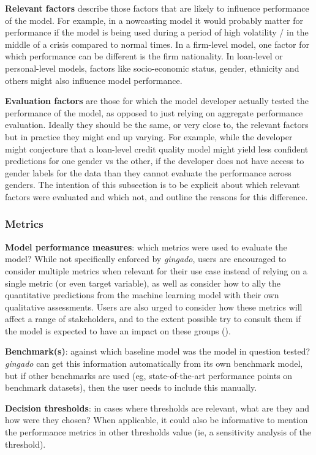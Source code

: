 \documentclass{article}
\begin{document}
\textbf{Relevant factors} describe those factors that are likely to influence performance of the model. For example, in a nowcasting model it would probably matter for performance if the model is being used during a period of high volatility / in the middle of a crisis compared to normal times. In a firm-level model, one factor for which performance can be different is the firm nationality. In loan-level or personal-level models, factors like socio-economic status, gender, ethnicity and others might also influence model performance.

\textbf{Evaluation factors} are those for which the model developer actually tested the performance of the model, as opposed to just relying on aggregate performance evaluation. Ideally they should be the same, or very close to, the relevant factors but in practice they might end up varying. For example, while the developer might conjecture that a loan-level credit quality model might yield less confident predictions for one gender vs the other, if the developer does not have access to gender labels for the data than they cannot evaluate the performance across genders. The intention of this subsection is to be explicit about which relevant factors were evaluated and which not, and outline the reasons for this difference.

\subsubsection{Metrics}
\textbf{Model performance measures}: which metrics were used to evaluate the model? While not specifically enforced by \textit{gingado}, users are encouraged to consider multiple metrics when relevant for their use case instead of relying on a single metric (or even target variable), as well as consider how to ally the quantitative predictions from the machine learning model with their own qualitative assessments. Users are also urged to consider how these metrics will affect a range of stakeholders, and to the extent possible try to consult them if the model is expected to have an impact on these groups (\cite{problemmetrics}).

\textbf{Benchmark(s)}: against which baseline model was the model in question tested? \textit{gingado} can get this information automatically from its own benchmark model, but if other benchmarks are used (eg, state-of-the-art performance points on benchmark datasets), then the user needs to include this manually.

\textbf{Decision thresholds}: in cases where thresholds are relevant, what are they and how were they chosen? When applicable, it could also be informative to mention the performance metrics in other thresholds value (ie, a sensitivity analysis of the threshold).
\end{document}

